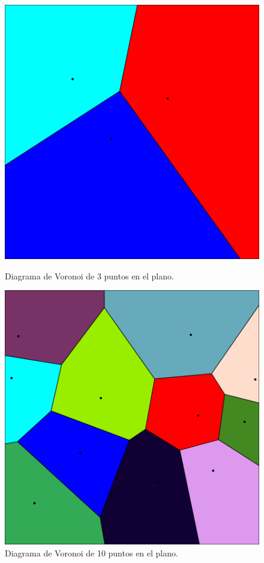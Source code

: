\documentclass{beamer}
\begin{document}
\begin{frame}
\begin{columns}
  \begin{figure}[H]
    \begin{overprint}
      \centering\includegraphics[width=\textwidth]{slidesRes/voronoi.png}
      \caption{Diagrama de Voronoi de 3 puntos en el plano.}
      \centering\includegraphics[width=\textwidth]{slidesRes/voronoi10.png}
      \caption{Diagrama de Voronoi de 10 puntos en el plano.}
    \end{overprint}
  \end{figure}
\end{columns}
\end{frame}
\end{document}
